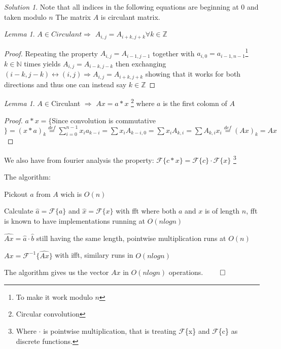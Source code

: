 \documentclass[a4paper,twoside=false,abstract=false,numbers=noenddot,
titlepage=false,headings=small,parskip=half,version=last]{scrartcl}
\theoremstyle{definition}
\theoremstyle{remark}
\newtheorem*{solution}{Solution}
\newtheorem{lemma}[theorem]{Lemma}
\newcommand{\NN}{\ensuremath{\mathbb{N}}}
\newcommand{\ZZ}{\ensuremath{\mathbb{Z}}}
\newcommand{\Fourier}{\ensuremath{\mathcal{F}}}
\begin{document}
\begin{solution}
Note that all indices in the following equations are beginning at $0$ and taken modulo $n$ 
The matrix $A$ is circulant matrix.
\begin{lemma} \label{Slider}
    $A \in Circulant \Rightarrow$ $A_{i,j}=A_{i+k,j+k} \forall k \in \ZZ$ 
\end{lemma}
\begin{proof}
    Repeating the property $A_{i,j}=A_{i-1,j-1}$ together with 
    $a_{i,0}=a_{i-1,n-1}$\footnote{To make it work modulo $n$} $k \in \NN$
    times yields $A_{i,j}=A_{i-k,j-k}$
    then exchanging $(i-k,j-k) \leftrightarrow (i,j) \Rightarrow A_{i,j}=A_{i+k,j+k}$
    showing that it works for both directions and thus one can instead say $k \in \ZZ$
\end{proof}
\begin{lemma}
    $A \in $Circulant $\Rightarrow$
    $Ax = a \ast x $ \footnote{Circular convolution} where $a$ is the first colomn of $A$
    \end{lemma}
\begin{proof}
    $a \ast x = \{$Since convolution is commutative$\} = (x \ast a)_k \stackrel{def}{=} 
    \displaystyle\sum_{i=0}^{n-1}{x_i a_{k-i}} = \sum{x_i A_{k-i,0}} = \sum x_i A_{k,i} = \sum A_{k,i} x_i \stackrel{def}{=} (Ax)_k = Ax$
\end{proof}

We also have from fourier analysis the property:
$\Fourier\{c \ast x\}=\Fourier\{c\} \cdot \Fourier\{x\}$
\footnote{Where $\cdot$ is pointwise multiplication,
that is treating \Fourier\{x\} and \Fourier\{c\} as discrete functions.} 

The algorithm:
\begin{list}{*}{}
 \item Pickout $a$ from $A$ wich is $O(n)$
 \item Calculate $\hat{a}=\Fourier\{a\}$ and $\hat{x}=\Fourier\{x\}$ 
 with fft where both $a$ and $x$ is of length $n$, fft is known to have implementations running at $O(nlogn)$
 \item $\widehat{Ax} = \hat{a} \cdot \hat{b}$ still having the same length, pointwise multiplication runs at $O(n)$
 \item $Ax = \Fourier^{-1}\{\widehat{Ax}\}$ with ifft, similary runs in $O(nlogn)$ 
\end{list}

The algorithm gives us the vector $Ax$ in $O(nlogn)$ operations. $\qed$

\end{solution}
\end{document}
